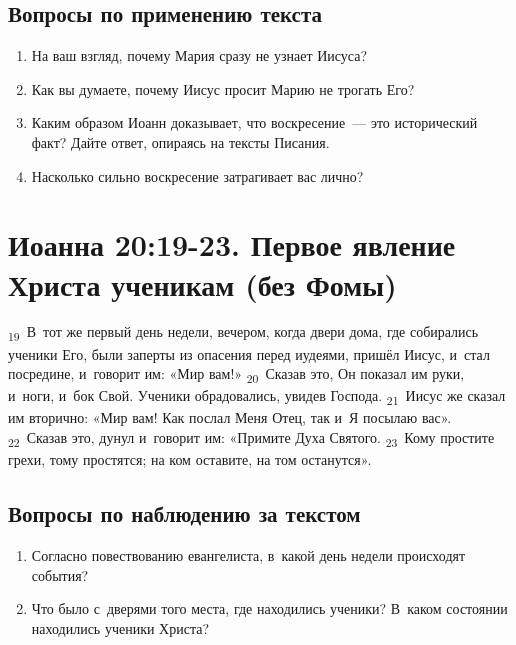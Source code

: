 \documentclass[a4paper,12pt]{article}
\begin{document}
\subsection*{Вопросы по применению текста} 
\begin{enumerate}
    \item На ваш взгляд, почему Мария сразу не узнает Иисуса? 
    
    \myline
    
    \myline
    \item Как вы думаете, почему Иисус просит Марию не трогать Его? 
    
    \myline
    
    \myline
    \item Каким образом Иоанн доказывает, что воскресение~--- это исторический факт? Дайте ответ, опираясь на тексты Писания. 
    
    \myline
    
    \myline
    \item Насколько сильно воскресение затрагивает вас лично? 
    
    \myline
    
    \myline
\end{enumerate}



\section{Иоанна 20:19-23. Первое явление Христа ученикам (без Фомы)}

\textsubscript{19}~В~тот же первый день недели, вечером, когда двери дома, где собирались ученики Его, были заперты из опасения перед иудеями, пришёл Иисус, и~стал посредине, и~говорит им: «Мир вам!»
\textsubscript{20}~Сказав это, Он показал им руки, и~ноги, и~бок Свой. Ученики обрадовались, увидев Господа.
\textsubscript{21}~Иисус же сказал им вторично: «Мир вам! Как послал Меня Отец, так и~Я посылаю вас».
\textsubscript{22}~Сказав это, дунул и~говорит им: «Примите Духа Святого.
\textsubscript{23}~Кому простите грехи, тому простятся; на ком оставите, на том останутся». 

\subsection*{Вопросы по наблюдению за текстом}
\begin{enumerate}
    \item Согласно повествованию евангелиста, в~какой день недели происходят события? 
    
    \myline
    
    \myline
    \item Что было с~дверями того места, где находились ученики? В~каком состоянии находились ученики Христа? 
    
    \myline
    
    \myline
\end{enumerate}
\end{document}
